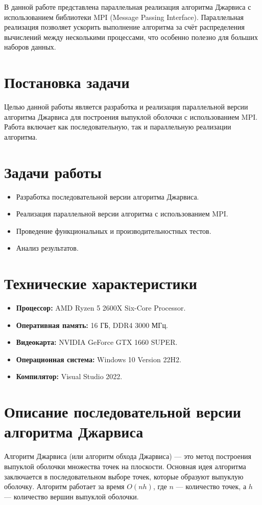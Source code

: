 \documentclass[12pt]{article}
\begin{document}
В данной работе представлена параллельная реализация алгоритма Джарвиса с использованием библиотеки MPI (Message Passing Interface). Параллельная реализация позволяет ускорить выполнение алгоритма за счёт распределения вычислений между несколькими процессами, что особенно полезно для больших наборов данных.

\section*{Постановка задачи}
Целью данной работы является разработка и реализация параллельной версии алгоритма Джарвиса для построения выпуклой оболочки с использованием MPI. Работа включает как последовательную, так и параллельную реализации алгоритма.

\section*{Задачи работы}
\begin{itemize}
    \item Разработка последовательной версии алгоритма Джарвиса.
    \item Реализация параллельной версии алгоритма с использованием MPI.
    \item Проведение функциональных и производительностных тестов.
    \item Анализ результатов.
\end{itemize}

\section*{Технические характеристики}
\begin{itemize}
    \item \textbf{Процессор:} AMD Ryzen 5 2600X Six-Core Processor.
    \item \textbf{Оперативная память:} 16 ГБ, DDR4 3000 МГц.
    \item \textbf{Видеокарта:} NVIDIA GeForce GTX 1660 SUPER.
    \item \textbf{Операционная система:} Windows 10 Version 22H2.
    \item \textbf{Компилятор:} Visual Studio 2022.
\end{itemize}

\section*{Описание последовательной версии алгоритма Джарвиса}
Алгоритм Джарвиса (или алгоритм обхода Джарвиса) — это метод построения выпуклой оболочки множества точек на плоскости. Основная идея алгоритма заключается в последовательном выборе точек, которые образуют выпуклую оболочку. Алгоритм работает за время \( O(nh) \), где \( n \) — количество точек, а \( h \) — количество вершин выпуклой оболочки.
\end{document}

